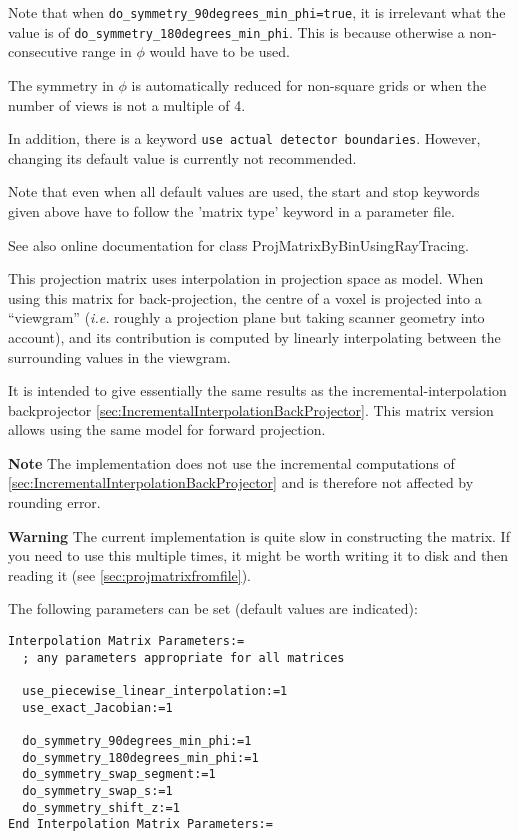 \documentclass{article}
\begin{document}
Note that when \texttt{do\_symmetry\_90degrees\_min\_phi=true}, 
it is irrelevant what the value is 
of \texttt{do\_symmetry\_180degrees\_min\_phi}. This is because 
otherwise a non-consecutive range in $\phi$ would have to be used.


The symmetry in $\phi$ is automatically reduced for non-square grids 
or when the number of views is not a multiple of 4.



In addition, there is a keyword \texttt{use actual detector boundaries}. 
However, changing its default value is currently not recommended. 




Note that even when all default values are used, the start and 
stop keywords given above have to follow the 'matrix type' keyword 
in a parameter file.


See also online documentation for class ProjMatrixByBinUsingRayTracing. 


{ 
}
\label{sec:projmatrixusinginterpolation}
This projection matrix uses interpolation in projection space as model. 
When using this matrix for back-projection, the centre of a voxel is projected 
into a ``viewgram'' (\textit{i.e.} roughly a projection plane but taking scanner 
geometry into account), and its contribution is computed by linearly interpolating
between the surrounding values in the viewgram.

It is intended to give
essentially the same results as the incremental-interpolation backprojector
\ref{sec:IncrementalInterpolationBackProjector}.
This matrix version allows using the same model for forward projection. 

\textbf{Note} The implementation does not use the incremental computations of 
\ref{sec:IncrementalInterpolationBackProjector} and is therefore not affected 
by rounding error.

\textbf{Warning} The current implementation is quite slow in constructing the matrix.
If you need to use this multiple times, it might be worth writing it to disk and
then reading it (see \ref{sec:projmatrixfromfile}).

{ 
}

The following parameters can be set (default values are indicated):

\begin{verbatim}
Interpolation Matrix Parameters:=
  ; any parameters appropriate for all matrices

  use_piecewise_linear_interpolation:=1
  use_exact_Jacobian:=1

  do_symmetry_90degrees_min_phi:=1
  do_symmetry_180degrees_min_phi:=1
  do_symmetry_swap_segment:=1
  do_symmetry_swap_s:=1
  do_symmetry_shift_z:=1
End Interpolation Matrix Parameters:=
\end{verbatim}
\end{document}
